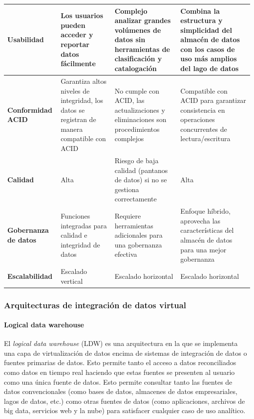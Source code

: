 \begin{longtable}{|p{3cm}|p{4cm}|p{4cm}|p{4cm}|}
    \textbf{Usabilidad}       & Los usuarios pueden acceder y reportar datos fácilmente     & Complejo analizar grandes volúmenes de datos sin herramientas de clasificación y catalogación & Combina la estructura y simplicidad del almacén de datos con los casos de uso más amplios del lago de datos \\ \hline
    \textbf{Conformidad ACID} & Garantiza altos niveles de integridad, los datos se registran de manera compatible con ACID & No cumple con ACID, las actualizaciones y eliminaciones son procedimientos complejos & Compatible con ACID para garantizar consistencia en operaciones concurrentes de lectura/escritura \\ \hline
    \textbf{Calidad}          & Alta                                                        & Riesgo de baja calidad (pantanos de datos) si no se gestiona correctamente   & Alta                                                                         \\ \hline
    \textbf{Gobernanza de datos} & Funciones integradas para calidad e integridad de datos   & Requiere herramientas adicionales para una gobernanza efectiva              & Enfoque híbrido, aprovecha las características del almacén de datos para una mejor gobernanza \\ \hline
    \textbf{Escalabilidad}    & Escalado vertical                                           & Escalado horizontal                                                          & Escalado horizontal                                                          \\ \hline
    \end{longtable}



\subsubsection{Arquitecturas de integración de datos virtual}


\paragraph{Logical data warehouse\newline}


El \textit{logical data warehouse} (LDW)
es una arquitectura en la que se implementa una capa de virtualización de datos
encima de sistemas de integración de datos o fuentes primarias de datos. Esto
permite tanto el acceso a datos reconciliados como datos en tiempo real haciendo que
estas fuentes se presenten al usuario como una única fuente de datos. Esto permite 
consultar tanto las fuentes de datos convencionales (como bases de datos, almacenes de datos empresariales, lagos de datos, etc.) 
como otras fuentes de datos (como aplicaciones, archivos de big data, servicios web y la nube) para satisfacer cualquier caso de uso analítico.

